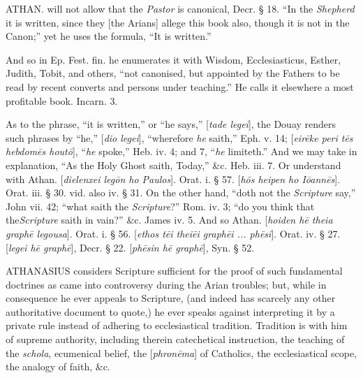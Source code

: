 ATHAN.
will not allow that the \emph{Pastor} is canonical, Decr. § 18. ``In
the \emph{Shepherd} it is written, since they [the Arians] allege this
book also, though it is not in the Canon;'' yet he uses the formula, ``It
is written.''

And
so in Ep. Fest. fin. he enumerates it with Wisdom, Ecclesiasticus,
Esther, Judith, Tobit, and others, ``not canonised, but appointed by
the Fathers to be read by recent converts and persons under teaching.''
He calls it elsewhere a most profitable book. Incarn. 3.

As
to the phrase, ``it is written,'' or ``he says,'' [\emph{tade legei}], the
Douay renders such phrases by ``he,'' [\emph{dio legei}], ``wherefore \emph{he}
saith,'' Eph. v. 14; [\emph{eir\={e}ke peri t\={e}s hebdom\={e}s
hout\={o}}], ``\emph{he} spoke,'' Heb. iv. 4; and 7, ``\emph{he}
limiteth.'' And we may take in explanation, ``As the Holy Ghost saith,
Today,'' \&c. Heb. iii. 7. Or understand with Athan. [\emph{dielenxei
leg\={o}n ho Paulos}]. Orat. i. § 57. [\emph{h\={o}s heipen ho
I\={o}ann\={e}s}]. Orat. iii. § 30. vid. also iv. § 31. On
the other hand, ``doth not the \emph{Scripture} say,'' John vii. 42; ``what
saith the \emph{Scripture}?'' Rom. iv. 3; ``do you think that the\emph{Scripture} saith in vain?'' \&c. James iv. 5. And so Athan. [\emph{hoiden
h\={e} theia graph\={e} legousa}]. Orat. i. § 56. [\emph{ethos
t\={e}i thei\={e}i graph\={e}i ... ph\={e}si}]. Orat.
iv. § 27. [\emph{legei h\={e} graph\={e}}], Decr. § 22. [\emph{ph\={e}sin
h\={e} graph\={e}}], Syn. § 52.


ATHANASIUS
considers Scripture sufficient for the proof of such fundamental
doctrines as came into controversy during the Arian troubles; but,
while in consequence he ever appeals to Scripture, (and indeed has
scarcely any other authoritative document to quote,) he ever speaks
against interpreting it by a private rule instead of adhering to
ecclesiastical tradition. Tradition is with him of supreme authority,
including therein catechetical instruction, the teaching of the \emph{schola},
ecumenical belief, the [\emph{phron\={e}ma}] of Catholics, the
ecclesiastical scope, the analogy of faith, \&c.

